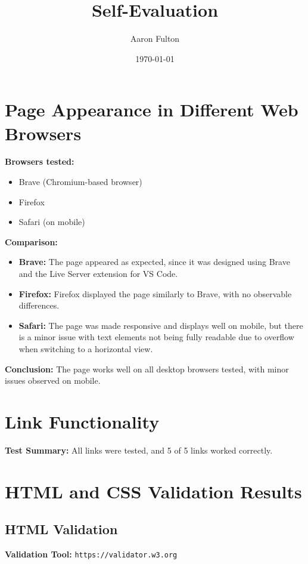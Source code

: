 \documentclass{article}
\title{Self-Evaluation}
\author{Aaron Fulton}
\date{\today}
\begin{document}
\maketitle
\newpage

\section{Page Appearance in Different Web Browsers}
\label{sec:page-appearance} 

\textbf{Browsers tested:}
\begin{itemize}
    \item Brave (Chromium-based browser)
    \item Firefox
    \item Safari (on mobile) 
\end{itemize}

\textbf{Comparison:}
\begin{itemize}
    \item \textbf{Brave:} The page appeared as expected, since it was designed using Brave and the Live Server extension for VS Code.
    \item \textbf{Firefox:} Firefox displayed the page similarly to Brave, with no observable differences.
    \item \textbf{Safari:} The page was made responsive and displays well on mobile, but there is a minor issue with text 
    elements not being fully readable due to overflow when switching to a horizontal view.
\end{itemize}

\textbf{Conclusion:} The page works well on all desktop browsers tested, with minor issues observed on mobile.

\section{Link Functionality}
\label{sec:link-functionality} 

\textbf{Test Summary:}
All links were tested, and 5 of 5 links worked correctly.

\section{HTML and CSS Validation Results}
\label{sec:validation-results} 

\subsection{HTML Validation}
\textbf{Validation Tool:} \texttt{https://validator.w3.org}
\end{document}
